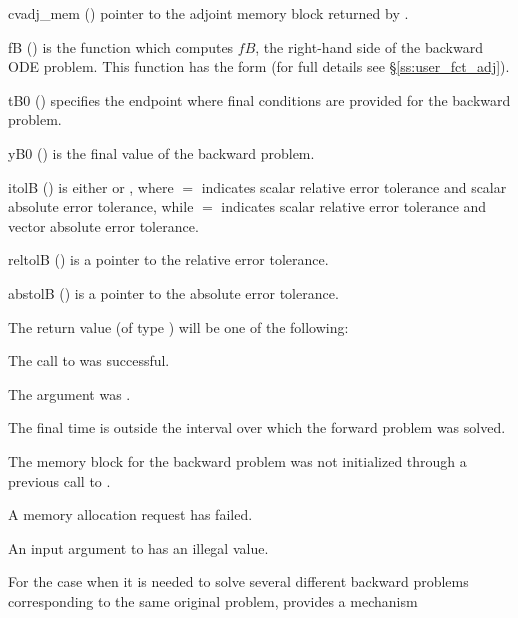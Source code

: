 {
  \begin{args}
  \item[cvadj\_mem] ()
    pointer to the adjoint memory block returned by .
  \item[fB] ()
    is the {\C} function which computes $fB$, the right-hand side of the 
    backward ODE problem. This function has the form 
     (for full details see \S\ref{ss:user_fct_adj}).
  \item[tB0] ()
    specifies the endpoint where final conditions are provided for the 
    backward problem.
  \item[yB0] ()
    is the final value of the backward problem. 
  \item[itolB] () 
    is either  or , where $=$ indicates scalar relative error 
    tolerance and scalar absolute error tolerance, while $=$ indicates scalar
    relative error tolerance and vector absolute error tolerance. 
  \item[reltolB] ()
    is a pointer to the relative error tolerance.
  \item[abstolB] ()
    is a pointer to the absolute error tolerance.
  \end{args}
}
{
  The return value  (of type ) will be one of the following:
  \begin{args}
  \item[\Id{CV\_SUCCESS}]
    The call to  was successful.
  \item[\Id{CV\_ADJMEM\_NULL}]
    The  argument was .
  \item[\Id{CV\_BAD\_TB0}]
    The final time  is outside the interval over which the forward problem
    was solved.
  \item[\Id{CV\_MEM\_NULL}] 
    The {\cvodes} memory block for the backward problem was not initialized through 
    a previous call to .
  \item[\Id{CV\_MEM\_FAIL}] 
    A memory allocation request has failed.
  \item[\Id{CV\_ILL\_INPUT}] 
    An input argument to  has an illegal value.
  \end{args}
}
{}
For the case when it is needed to solve several different backward problems 
corresponding to the same original problem, {\cvodes} provides a mechanism 
